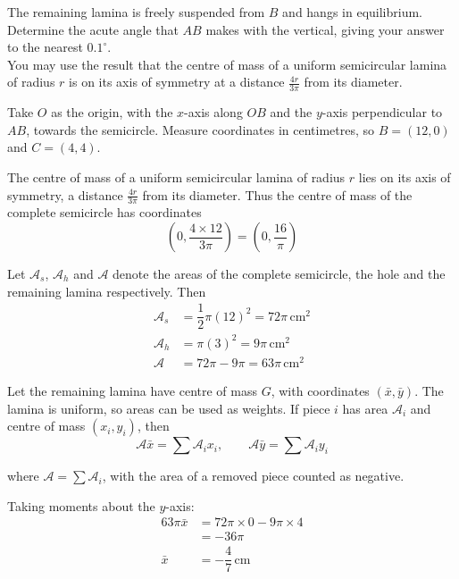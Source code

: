 \documentclass[leqno]{article}
\begin{document}
\begin{enumerate}[
  label=\textbf{\arabic*.},
  leftmargin=*,
  topsep=0pt,
  partopsep=0pt,
  parsep=0pt
]
The remaining lamina is freely suspended from $B$ and hangs in equilibrium. \\

Determine the acute angle that $AB$ makes with the vertical, giving your answer to the nearest $0.1^\circ$. \\

You may use the result that the centre of mass of a uniform semicircular lamina of radius $r$ is on its axis of symmetry at a distance $\frac{4r}{3\pi}$ from its diameter.  \\

\vspace*{10pt}

\begin{djsSolution}
Take \(O\) as the origin, with the \(x\)-axis along \(OB\) and the \(y\)-axis perpendicular to \(AB\), towards the semicircle. Measure coordinates in centimetres, so \(B=(12,0)\) and \(C=(4,4)\).

The centre of mass of a uniform semicircular lamina of radius \(r\) lies on its axis of symmetry, a distance \(\frac{4r}{3\pi}\) from its diameter. Thus the centre of mass of the complete semicircle has coordinates
\[
\left(0,\dfrac{4\times12}{3\pi}\right)=\left(0,\dfrac{16}{\pi}\right)
\]

Let \(\mathcal{A}_s\), \(\mathcal{A}_h\) and \(\mathcal{A}\) denote the areas of the complete semicircle, the hole and the remaining lamina respectively. Then
\begin{align*}
\mathcal{A}_s&=\dfrac12\pi(12)^2=72\pi\,\mathrm{cm^2}\\
\mathcal{A}_h&=\pi(3)^2=9\pi\,\mathrm{cm^2}\\
\mathcal{A}&=72\pi-9\pi=63\pi\,\mathrm{cm^2}
\end{align*}

Let the remaining lamina have centre of mass \(G\), with coordinates \((\bar{x},\bar{y})\). The lamina is uniform, so areas can be used as weights. If piece \(i\) has area \(\mathcal{A}_i\) and centre of mass \((x_i,y_i)\), then
\[
\mathcal{A}\bar{x}=\sum\mathcal{A}_ix_i,\qquad \mathcal{A}\bar{y}=\sum\mathcal{A}_iy_i
\]

where \(\mathcal{A}=\sum\mathcal{A}_i\), with the area of a removed piece counted as negative.

Taking moments about the \(y\)-axis:
\begin{align*}
63\pi\bar{x}&=72\pi\times0-9\pi\times4\\
&=-36\pi\\
\bar{x}&=-\dfrac47\,\mathrm{cm}
\end{align*}


\end{djsSolution}
\end{enumerate}
\end{document}

